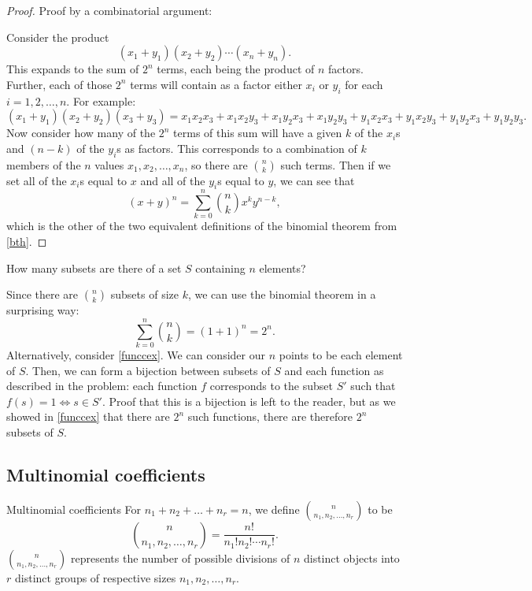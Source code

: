 \begin{proof}
    Proof by a combinatorial argument:
    
    \vspace{5pt}
    
    \noindent Consider the product \[
        (x_1 + y_1)(x_2 + y_2)\cdots(x_n + y_n).    
    \] This expands to the sum of $2^n$ terms, each being the product of $n$ factors. Further, each of those $2^n$ terms will contain as a factor either $x_i$ or $y_i$ for each $i = 1, 2, \dots, n$. For example: \[
        (x_1 + y_1)(x_2 + y_2)(x_3 + y_3) = x_1x_2x_3 + x_1x_2y_3 + x_1y_2x_3 +x_1y_2y_3 + y_1x_2x_3 + y_1x_2y_3 + y_1y_2x_3 + y_1y_2y_3.    
    \] Now consider how many of the $2^n$ terms of this sum will have a given $k$ of the $x_i$s and $(n - k)$ of the $y_i$s as factors. This corresponds to a combination of $k$ members of the $n$ values $x_1, x_2, \dots, x_n$, so there are ${n \choose k}$ such terms. Then if we set all of the $x_i$s equal to $x$ and all of the $y_i$s equal to $y$, we can see that \[
        (x+y)^n = \sum^n_{k=0}{n \choose k}x^ky^{n-k},   
    \] which is the other of the two equivalent definitions of the binomial theorem from \autoref{bth}.
\end{proof}

\begin{changebar}
    \begin{example}
        How many subsets are there of a set $S$ containing $n$ elements?
    \end{example}
    \begin{solution}
        Since there are ${n \choose k}$ subsets of size $k$, we can use the binomial theorem in a surprising way: \[
            \sum^n_{k=0}{n \choose k} = (1 + 1)^n = 2^n.
            \]
            Alternatively, consider \autoref{funccex}. We can consider our $n$ points to be each element of $S$. Then, we can form a bijection between subsets of $S$ and each function as described in the problem: each function $f$ corresponds to the subset $S'$ such that $f(s) = 1 \iff s \in S'$. Proof that this is a bijection is left to the reader, but as we showed in \autoref{funccex} that there are $2^n$ such functions, there are therefore $2^n$ subsets of $S$.
        \end{solution}
    \end{changebar}

\pagebreak
\subsection{Multinomial coefficients}
\begin{bdef}{Multinomial coefficients}
    For $n_1 + n_2 + \dots + n_r = n$, we define $\displaystyle {n \choose n_1,n_2,\dots,n_r}$ to be \[
        {n \choose n_1,n_2,\dots,n_r} = \frac{n!}{n_1!n_2!\cdots n_r!}.
    \] ${n \choose n_1, n_2, \dots, n_r}$ represents the number of possible divisions of $n$ distinct objects into $r$ distinct groups of respective sizes $n_1, n_2, \dots, n_r$.
\end{bdef}

